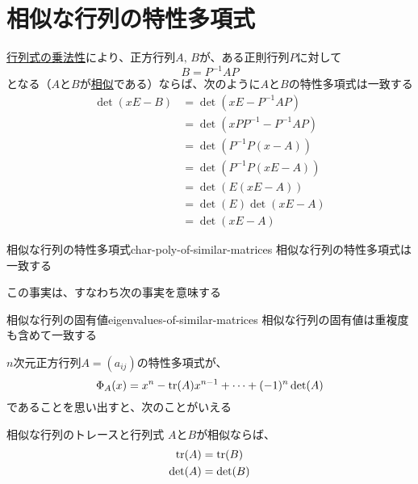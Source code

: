 \documentclass[../../../topic_linear-algebra]{subfiles}
\begin{document}
\sectionline
\section{相似な行列の特性多項式}

\hyperref[thm:determinant-multiplicativity]{行列式の乗法性}により、正方行列$A,\,B$が、ある正則行列$P$に対して
\begin{equation*}
  B = P^{-1}AP
\end{equation*}
となる（$A$と$B$が\hyperref[def:similar-matrices]{相似}である）ならば、次のように$A$と$B$の特性多項式は一致する
\begin{align*}
  \det(xE - B) & = \det(xE - P^{-1}AP)       \\
               & = \det(xPP^{-1} - P^{-1}AP) \\
               & = \det(P^{-1}P(x - A))      \\
               & = \det(P^{-1}P(xE - A))     \\
               & = \det(E(xE - A))           \\
               & = \det(E)\det(xE - A)       \\
               & = \det(xE - A)
\end{align*}

\begin{theorem}{相似な行列の特性多項式}{char-poly-of-similar-matrices}
  相似な行列の特性多項式は一致する
\end{theorem}

この事実は、すなわち次の事実を意味する

\begin{theorem}{相似な行列の固有値}{eigenvalues-of-similar-matrices}
  相似な行列の固有値は重複度も含めて一致する
\end{theorem}

\sectionline

$n$次元正方行列$A = (a_{ij})$の特性多項式が、
\begin{equation*}
  \Phi_A(x) = x^n - \tr(A)x^{n-1} + \cdots + (-1)^n \det(A)
\end{equation*}
であることを思い出すと、次のことがいえる

\begin{theorem*}{相似な行列のトレースと行列式}
  $A$と$B$が相似ならば、
  \begin{align*}
    \tr(A)  & = \tr(B)  \\
    \det(A) & = \det(B)
  \end{align*}
\end{theorem*}
\end{document}
